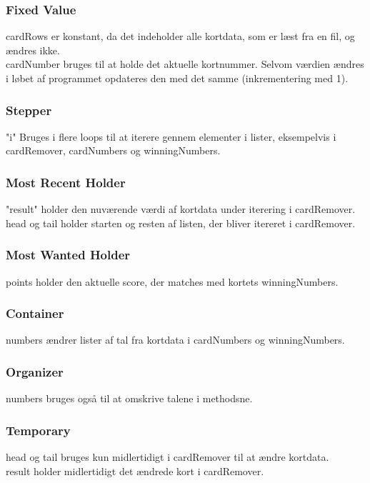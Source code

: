\documentclass[a4paper,12pt]{article}
\begin{document}
\subsubsection*{Fixed Value}
cardRows er konstant, da det indeholder alle kortdata, som er læst fra en fil, og ændres ikke.\\
cardNumber bruges til at holde det aktuelle kortnummer. Selvom værdien ændres i løbet af programmet opdateres den med det samme (inkrementering med 1).

\subsubsection*{Stepper}
"i" Bruges i flere loops til at iterere gennem elementer i lister, eksempelvis i cardRemover, cardNumbers og winningNumbers.

\subsubsection*{Most Recent Holder}
"result" holder den nuværende værdi af kortdata under iterering i cardRemover.\\
head og tail holder starten og resten af listen, der bliver itereret i cardRemover.

\subsubsection*{Most Wanted Holder}
points holder den aktuelle score, der matches med kortets winningNumbers.

\subsubsection*{Container}
numbers ændrer lister af tal fra kortdata i cardNumbers og winningNumbers.

\subsubsection*{Organizer}
numbers bruges også til at omskrive talene i methodsne.

\subsubsection*{Temporary}
head og tail bruges kun midlertidigt i cardRemover til at ændre kortdata.\\
result holder midlertidigt det ændrede kort i cardRemover.
\end{document}
